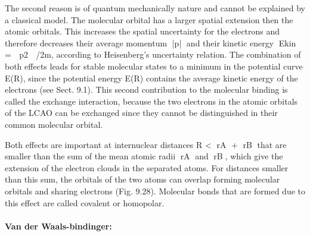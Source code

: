 The second reason is of quantum mechanically nature
and cannot be explained by a classical model.
The molecular orbital has a larger spatial extension
then the atomic orbitals. This increases the spatial
uncertainty for the electrons and therefore decreases
their average momentum |p| and their kinetic energy
Ekin =

p2

/2m, according to Heisenberg’s uncertainty
relation. The combination of both effects leads
for stable molecular states to a minimum in the potential
curve E(R), since the potential energy E(R)
contains the average kinetic energy of the electrons (see
Sect. 9.1). This second contribution to the molecular
binding is called the exchange interaction, because the
two electrons in the atomic orbitals of the LCAO can be
exchanged since they cannot be distinguished in their
common molecular orbital.

Both effects are important at internuclear distances
R < rA + rB that are smaller than the sum of the
mean atomic radii rA and rB, which give the extension
of the electron clouds in the separated atoms.
For distances smaller than this sum, the orbitals of
the two atoms can overlap forming molecular orbitals
and sharing electrons (Fig. 9.28). Molecular bonds that
are formed due to this effect are called covalent or
homopolar.



\paragraph{Van der Waals-bindinger:}